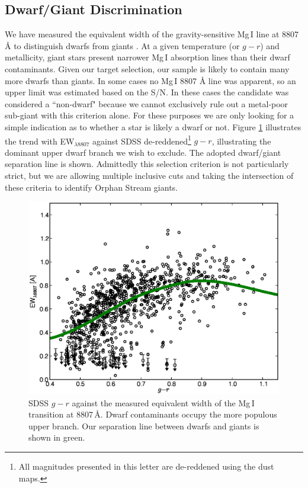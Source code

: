 \documentclass[10pt,apjl]{emulateapj}
\begin{document}
\subsection{Dwarf/Giant Discrimination}
\label{sec:dwarf-giant}

We have measured the equivalent width of the gravity-sensitive Mg\,\textsc{I} line at 8807 \AA{} to distinguish dwarfs from giants \citep{Battaglia_Starkenburg_2012}. At a given temperature (or $g - r$) and metallicity, giant stars present narrower Mg\,\textsc{I} absorption lines than their dwarf contaminants. Given our target selection, our sample is likely to contain many more dwarfs than giants. In some cases no Mg\,\textsc{I} 8807 \AA{} line was apparent, so an upper limit was estimated based on the S/N. In these cases the candidate was considered a ``non-dwarf" because we cannot exclusively rule out a metal-poor sub-giant with this criterion alone. For these purposes we are only looking for a simple indication as to whether a star is likely a dwarf or not. Figure \ref{fig:ew-mg} illustrates the trend with EW$_{\lambda8807}$ against SDSS de-reddened\footnote{All magnitudes presented in this letter are de-reddened using the \citet{Schlegel_Finkbeiner_Davis_1998} dust maps.} $g - r$, illustrating the dominant upper dwarf branch we wish to exclude. The adopted dwarf/giant separation line is shown. Admittedly this selection criterion is not particularly strict, but we are allowing multiple inclusive cuts and taking the intersection of these criteria to identify Orphan Stream giants.

\begin{figure}[h]
	\includegraphics[width=\columnwidth]{./fig2.eps}
	\caption{SDSS $g - r$ against the measured equivalent width of the Mg\,\textsc{I} transition at 8807\,\AA{}. Dwarf contaminants occupy the more populous upper branch. Our separation line between dwarfs and giants is shown in green.}
	\label{fig:ew-mg}
\end{figure}
\end{document}
